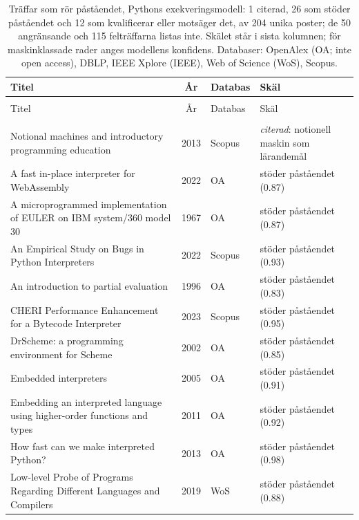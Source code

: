 \begingroup\footnotesize
\begin{longtable}{@{}%
  >{\raggedright\arraybackslash}p{}c%
  >{\raggedright\arraybackslash}p{}%
  >{\raggedright\arraybackslash}p{}@{}}
\caption{Träffar som rör påståendet, Pythons exekveringsmodell: 1 citerad, 26 som stöder påståendet och 12 som kvalificerar eller motsäger det, av 204 unika poster; de 50 angränsande och 115 felträffarna listas inte.  Skälet står i sista kolumnen; för maskinklassade rader anges modellens konfidens.  Databaser: OpenAlex (OA; inte \foreignlanguage{english}{open access}), DBLP, IEEE Xplore (IEEE), Web of Science (WoS), Scopus.}\label{tab:sok-python-tolkat}\\
\toprule
Titel & År & Databas & Skäl \\
\midrule
\endfirsthead
\multicolumn{4}{@{}l}{\emph{\tablename~\thetable{} (\GetTranslation{continued})}}\\
\toprule Titel & År & Databas & Skäl \\ \midrule
\endhead
\midrule \multicolumn{4}{r@{}}{\emph{\GetTranslation{continued on the next page}}}\\
\endfoot
\bottomrule
\endlastfoot
Notional machines and introductory programming education & 2013 & Scopus & \emph{citerad}: notionell maskin som lärandemål \\
A fast in-place interpreter for WebAssembly & 2022 & OA & stöder påståendet (0.87) \\
A microprogrammed implementation of EULER on IBM system/360 model 30 & 1967 & OA & stöder påståendet (0.87) \\
An Empirical Study on Bugs in Python Interpreters & 2022 & Scopus & stöder påståendet (0.93) \\
An introduction to partial evaluation & 1996 & OA & stöder påståendet (0.83) \\
CHERI Performance Enhancement for a Bytecode Interpreter & 2023 & Scopus & stöder påståendet (0.95) \\
DrScheme: a programming environment for Scheme & 2002 & OA & stöder påståendet (0.85) \\
Embedded interpreters & 2005 & OA & stöder påståendet (0.91) \\
Embedding an interpreted language using higher-order functions and types & 2011 & OA & stöder påståendet (0.92) \\
How fast can we make interpreted Python? & 2013 & OA & stöder påståendet (0.98) \\
Low-level Probe of Programs Regarding Different Languages and Compilers & 2019 & WoS & stöder påståendet (0.88) \\

\end{longtable}
